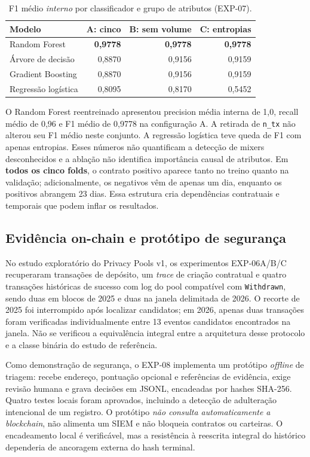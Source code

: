 \documentclass[12pt]{article}
\begin{document}
\begin{table}[ht]
\centering\small
\caption{F1 médio \emph{interno} por classificador e grupo de atributos (EXP-07).}
\label{tab:f1}
\begin{tabular}{lrrr}
\toprule
Modelo & A: cinco & B: sem volume & C: entropias \\
\midrule
Random Forest & \textbf{0,9778} & \textbf{0,9778} & \textbf{0,9778} \\
Árvore de decisão & 0,8870 & 0,9156 & 0,9159 \\
Gradient Boosting & 0,8870 & 0,9156 & 0,9159 \\
Regressão logística & 0,8095 & 0,8170 & 0,5452 \\
\bottomrule
\end{tabular}
\end{table}

O Random Forest reentreinado apresentou precision média interna de 1,0, recall médio de 0,96 e F1 médio de 0,9778 na configuração A. A retirada de \texttt{n\_tx} não alterou seu F1 médio neste conjunto. A regressão logística teve queda de F1 com apenas entropias. Esses números não quantificam a detecção de mixers desconhecidos e a ablação não identifica importância causal de atributos. Em \textbf{todos os cinco folds}, o contrato positivo aparece tanto no treino quanto na validação; adicionalmente, os negativos vêm de apenas um dia, enquanto os positivos abrangem 23 dias. Essa estrutura cria dependências contratuais e temporais que podem inflar os resultados.

\subsection{Evidência on-chain e protótipo de segurança}
No estudo exploratório do Privacy Pools v1, os experimentos EXP-06A/B/C recuperaram transações de depósito, um \emph{trace} de criação contratual e quatro transações históricas de sucesso com log do pool compatível com \texttt{Withdrawn}, sendo duas em blocos de 2025 e duas na janela delimitada de 2026. O recorte de 2025 foi interrompido após localizar candidatos; em 2026, apenas duas transações foram verificadas individualmente entre 13 eventos candidatos encontrados na janela. Não se verificou a equivalência integral entre a arquitetura desse protocolo e a classe binária do estudo de referência.

Como demonstração de segurança, o EXP-08 implementa um protótipo \emph{offline} de triagem: recebe endereço, pontuação opcional e referências de evidência, exige revisão humana e grava decisões em JSONL, encadeadas por hashes SHA-256. Quatro testes locais foram aprovados, incluindo a detecção de adulteração intencional de um registro. O protótipo \emph{não consulta automaticamente a blockchain}, não alimenta um SIEM e não bloqueia contratos ou carteiras. O encadeamento local é verificável, mas a resistência à reescrita integral do histórico dependeria de ancoragem externa do hash terminal.
\end{document}

